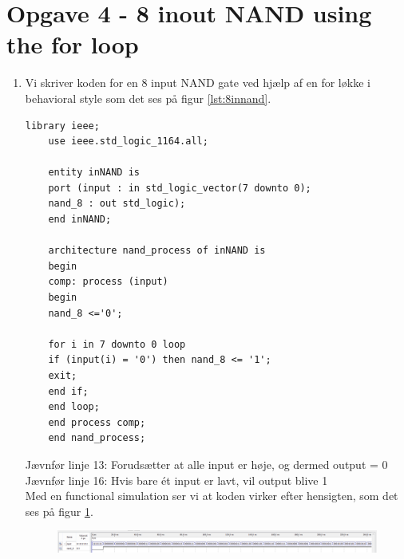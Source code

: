 \section{Opgave 4 - 8 inout NAND using the for loop}
\begin{enumerate}
	\item[1)]
	Vi skriver koden for en 8 input NAND gate ved hjælp af en for løkke i behavioral style som det ses på figur \ref{lst:8innand}.\\
	\begin{lstlisting}[caption={Behavioral style kode en 8 input NAND gate},label={lst:8innand}]
	library ieee;
	use ieee.std_logic_1164.all;
	
	entity inNAND is
	port (input : in std_logic_vector(7 downto 0);
	nand_8 : out std_logic);
	end inNAND;
	
	architecture nand_process of inNAND is
	begin
	comp: process (input)
	begin
	nand_8 <='0';
	
	for i in 7 downto 0 loop
	if (input(i) = '0') then nand_8 <= '1'; 
	exit;
	end if;
	end loop;
	end process comp;
	end nand_process;
	\end{lstlisting}
	Jævnfør linje 13: Forudsætter at alle input er høje, og dermed output = 0\\
	Jævnfør linje 16: Hvis bare ét input er lavt, vil output blive 1\\
	\clearpage
	Med en functional simulation ser vi at koden virker efter hensigten, som det ses på figur \ref{fig:8innand}.\\
	\begin{figure}[h]
		\centering
		\includegraphics[scale=0.8]{pictures/Oevelse5/opg4/func_sim_8nand.JPG}
		\caption{}
		\label{fig:8innand}
	\end{figure}
\end{enumerate}